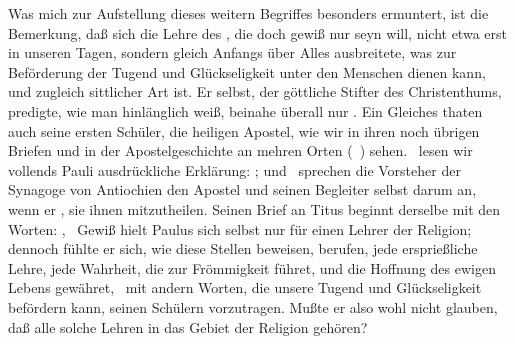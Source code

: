\begin{aufza}
\item Was mich zur Aufstellung dieses weitern Begriffes besonders ermuntert, ist die Bemerkung, daß sich die Lehre des , die doch gewiß nur  seyn will, nicht etwa erst in unseren Tagen, sondern gleich Anfangs über Alles ausbreitete, was zur Beförderung der Tugend und Glückseligkeit unter den Menschen dienen kann, und zugleich sittlicher Art ist. Er selbst, der göttliche Stifter des Christenthums, predigte, wie man hinlänglich weiß, beinahe überall nur . Ein Gleiches thaten auch seine ersten Schüler, die heiligen Apostel, wie wir in ihren noch übrigen Briefen und in der Apostelgeschichte an mehren Orten (\zB\ ) sehen. \ lesen wir vollends Pauli ausdrückliche Erklärung: ; und \ sprechen die Vorsteher der Synagoge von Antiochien den Apostel und seinen Begleiter selbst darum an, wenn er , sie ihnen mitzutheilen. Seinen Brief an Titus beginnt derselbe mit den Worten: , \usw\ Gewiß hielt Paulus sich selbst nur für einen Lehrer der Religion; dennoch fühlte er sich, wie diese Stellen beweisen, berufen, jede ersprießliche Lehre, jede Wahrheit, die zur Frömmigkeit führet, und die Hoffnung des ewigen Lebens gewähret, \dh\ mit andern Worten, die unsere Tugend und Glückseligkeit befördern kann, seinen Schülern vorzutragen. Mußte er also wohl nicht glauben, daß alle solche Lehren in das Gebiet der Religion gehören?

\end{aufza}
